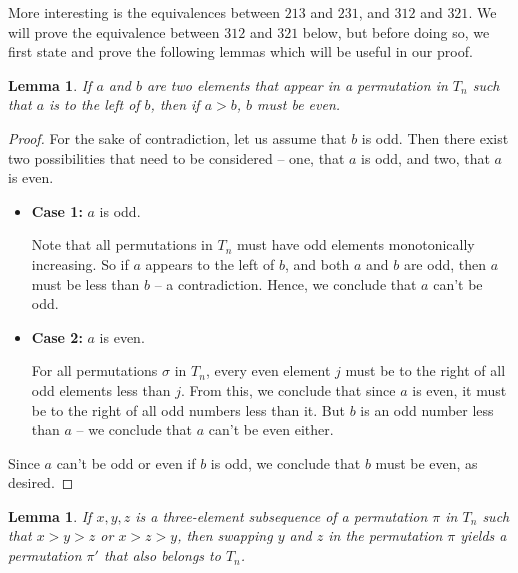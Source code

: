 \documentclass[11pt,letterpaper,twoside,english]{article}
\theoremstyle{theorem}
\newtheorem{lemma}[theorem]{Lemma}
\theoremstyle{remark}
\begin{document}
More interesting is the equivalences between $213$ and $231$, and $312$ and $321$. We will prove the equivalence between $312$ and $321$ below, but before doing so, we first state and prove the following lemmas which will be useful in our proof.

\begin{lemma}
\label{tn_avoidance}
If $a$ and $b$ are two elements that appear in a permutation in $T_n$ such that $a$ is to the left of $b$, then if $a > b$, $b$ must be even.
\end{lemma}

\begin{proof}
For the sake of contradiction, let us assume that $b$ is odd. Then there exist two possibilities that need to be considered -- one, that $a$ is odd, and two, that $a$ is even.

\begin{itemize}
\item \textbf{Case 1:} $a$ is odd.

Note that all permutations in $T_n$ must have odd elements monotonically increasing. So if $a$ appears to the left of $b$, and both $a$ and $b$ are odd, then $a$ must be less than $b$ -- a contradiction. Hence, we conclude that $a$ can't be odd.

\item \textbf{Case 2:} $a$ is even.

For all permutations $\sigma$ in $T_n$, every even element $j$ must be to the right of all odd elements less than $j$. From this, we conclude that since $a$ is even, it must be to the right of all odd numbers less than it. But $b$ is an odd number less than $a$ -- we conclude that $a$ can't be even either.
\end{itemize}

Since $a$ can't be odd or even if $b$ is odd, we conclude that $b$ must be even, as desired.
\end{proof}

\begin{lemma}
\label{swapping_lemma}
If $x, y, z$ is a three-element subsequence of a permutation $\pi$ in $T_n$ such that $x > y > z$ or $x > z > y$, then swapping $y$ and $z$ in the permutation $\pi$ yields a permutation $\pi'$ that also belongs to $T_n$.
\end{lemma}
\end{document}
